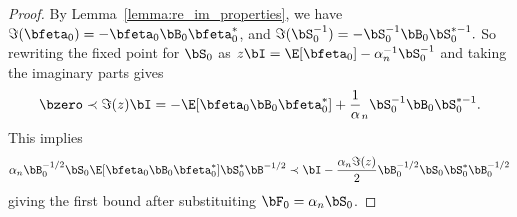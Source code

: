 \begin{proof}
By Lemma~\ref{lemma:re_im_properties}, we have
$\Im(\bfeta_0) = -\bfeta_0\bB_0 \bfeta_0^*$, and $\Im(\bS_0^{-1}) = - \bS_0^{-1} \bB_0\bS_{0}^{*-1}.$
So rewriting the fixed point for $\bS_0$ as
    $z\bI = \E[\bfeta_0] - \alpha_n^{-1} \bS_0^{-1}$ and taking the imaginary parts
gives
\begin{equation}
\nonumber
\bzero\prec \Im(z) \bI = - \E[\bfeta_0 \bB_0 \bfeta_0^*] + \frac1\alpha_n\bS_0^{-1}\bB_0\bS_0^{*-1}.
\end{equation}
This implies
\begin{equation}
\nonumber
    \alpha_n \bB_0^{-1/2} \bS_0\E[\bfeta_0 \bB_0\bfeta_0^*] \bS_0^* \bB^{-1/2} \prec 
    \bI - \frac{\alpha_n\Im(z)}{2} \bB_0^{-1/2}\bS_0\bS^*_0 \bB_0^{-1/2}
\end{equation}
giving the first bound after substituiting $\bF_0 = \alpha_n 
\bS_0$.


\end{proof}
